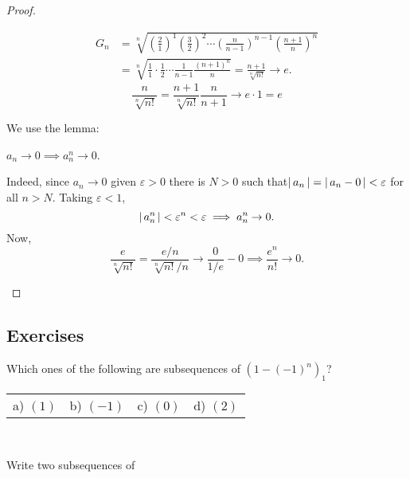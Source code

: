 \documentclass{book}
\begin{document}
\begin{proof}
\item
\begin{hEnumerateAlpha}
\item
\begin{align*}
G_{n} & = \sqrt[n]{\left(\frac{2}{1}\right)^{1} \left(\frac{3}{2}\right)^{2} \cdots \left(\frac{n}{n-1}\right)^{n-1} \left(\frac{n+1}{n}\right)^{n}}\\ & =  \sqrt[n]{\frac{1}{1} \cdot \frac{1}{2} \cdots \frac{1}{n-1} \frac{(n+1)^{n}}{n}} = \frac{n+1}{\sqrt[n]{n!}} \rightarrow e.
\end{align*}
$$
\frac{n}{\sqrt[n]{n!} }= \frac{n+1}{\sqrt[n]{n!}} \frac{n}{n+1} \rightarrow e\cdot1 = e
$$
\item
We use the lemma:
\begin{lem}
${{a_{n}} \to 0} \implies {{a_{n}^{n}} \to 0}$.
\end{lem}
Indeed, since ${a_{n}} \to 0$ given $\varepsilon>0$ there is $N>0$ such that$\left \lvert \, a_n \, \right \rvert = \left \lvert \, a_n - 0 \, \right \rvert<\varepsilon$ for all $n>N$. Taking $\varepsilon<1$,
$$
\left \lvert \, a_{n}^{n} \, \right \rvert<\varepsilon^n<\varepsilon \implies a_{n}^{n}  \to 0.
$$
Now,
$$
\frac{e}{\sqrt[n]{n!}}=\frac{e/n}{\sqrt[n]{n!}/n} \rightarrow \frac{0}{1/e} - 0 \implies \frac{e^n}{n!}\rightarrow0.
$$


\end{hEnumerateAlpha}
\end{proof}

\subsection{Exercises}
\begin{exercise}
Which ones of the following are subsequences of $(1-(-1)^n)_1$?
\begin{center}
	\begin{tabular}{llll}
		a) $(1)$ \quad  \quad
		&b) $(-1)$ \quad  \quad 
		&c) $(0)$ \quad  \quad
		&d) $(2)$ \quad  \quad
	\end{tabular}\\
	\end{center}
\end{exercise}

\begin{exercise}
\label{ex:01:01:002}
Write two subsequences of
\end{exercise}
\end{document}
